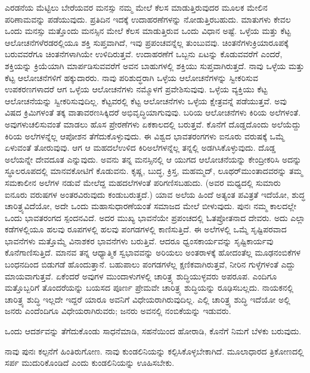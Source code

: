 ಎರಡನೆಯ ಮೆಟ್ಟಿಲು ಬೇರೆಯವರ ಮನಸ್ಸು ನಮ್ಮ ಮೇಲೆ ಕೆಲಸ ಮಾಡುತ್ತಿರುವುದರ ಮೂಲಕ ಮೇಲಿನ ಪರಿಣಾಮವನ್ನು ಪಡೆಯುವುದು. ಪ್ರತಿದಿನ ಇದಕ್ಕೆ ಉದಾಹರಣೆಗಳನ್ನು ನೋಡುತ್ತಿರಬಹುದು. ಮಾತುಗಳು ಕೇವಲ ಒಂದು ಮನಸ್ಸು ಮತ್ತೊಂದು ಮನಸ್ಸಿನ ಮೇಲೆ ಕೆಲಸ ಮಾಡುತ್ತಿರುವ ಒಂದು ವಿಧಾನ ಅಷ್ಟೆ. ಒಳ್ಳೆಯ ಮತ್ತು ಕೆಟ್ಟ ಆಲೋಚನೆ\-ಗಳೆರಡರಲ್ಲಿಯೂ ಶಕ್ತಿ ಸುಪ್ತವಾಗಿದೆ, ಇವು ಪ್ರಪಂಚವನ್ನೆಲ್ಲ ತುಂಬುವವು. ಚಿಂತನೆಗಳು\break ಕ್ರಿಯಾರೂಪಕ್ಕೆ ಬರುವವರೆಗೂ ಚಿಂತನೆಗಳಾಗಿಯೇ ಉಳಿದಿರುತ್ತವೆ. ಉದಾಹರಣೆಗೆ ಒಬ್ಬನು ಏಟನ್ನು ಕೊಡುವವರೆಗೆ ಎಂದರೆ, ಶಕ್ತಿಯನ್ನು ಕ್ರಿಯೆಯಾಗಿ ಮಾರ್ಪಡಿಸುವವರೆಗೆ ಅವನ ಬಾಹುಗಳಲ್ಲಿ ಶಕ್ತಿಯು ಸುಪ್ತವಾಗಿರುತ್ತದೆ. ನಾವು ಒಳ್ಳೆಯ ಮತ್ತು ಕೆಟ್ಟ ಆಲೋಚನೆಗಳಿಗೆ ಹಕ್ಕುದಾರರು. ನಾವು ಪರಿಶುದ್ಧರಾಗಿ ಒಳ್ಳೆಯ ಆಲೋಚನೆಗಳನ್ನು ಸ್ವೀಕರಿಸುವ ಉಪಕರಣಗಳಾದರೆ ಆಗ ಒಳ್ಳೆಯ ಆಲೋಚನೆಗಳು ನಮ್ಮೊಳಗೆ ಪ್ರವೇಶಿಸುವುವು. ಒಳ್ಳೆಯ ವ್ಯಕ್ತಿಯು ಕೆಟ್ಟ ಆಲೋಚನೆಯನ್ನು ಸ್ವೀಕರಿಸುವುದಿಲ್ಲ. ಕೆಟ್ಟವರಲ್ಲಿ ಕೆಟ್ಟ ಆಲೋಚನೆ\break ಗಳು ಒಳ್ಳೆಯ ಕ್ಷೇತ್ರವನ್ನೆ ಪಡೆಯುತ್ತವೆ. ಅವು ವಿಷದ ಕ್ರಿಮಿಗಳಂತೆ ತಕ್ಕ ವಾತಾವರಣ\break ಸಿಕ್ಕಿದರೆ ಅಭಿವೃದ್ಧಿಯಾಗುವುವು. ಬರಿಯ ಆಲೋಚನೆಗಳು ಕಿರಿಯ ಅಲೆಗಳಂತೆ. ಅವುಗಳು\break ಚಲಿಸುವಂತೆ ಮಾಡಲು ಹೊಸ ಪ್ರೇರಣೆಗಳು ಏಕಕಾಲದಲ್ಲಿ ಬರುತ್ತವೆ. ಕೊನೆಗೆ ದೊಡ್ಡದೊಂದು ಅಲೆಯೆದ್ದು ಕಿರಿಯ ಅಲೆಗಳನ್ನೆಲ್ಲ ಆಪೋಶನ ತೆಗೆದುಕೊಳ್ಳುವುದು. ಈ ವಿಶ್ವದ ಭಾವತರಂಗಗಳು ಐನೂರು ವರುಷಕ್ಕೆ ಒಮ್ಮೆ ಏಳುವಂತೆ ತೋರುವುವು. ಆಗ ಆ ಮಹದಲೆ\break ಉಳಿದ ಕಿರಿಅಲೆಗಳನ್ನೆಲ್ಲ ತನ್ನಲ್ಲಿ ಅಡಗಿಸಿಕೊಳ್ಳುವುದು. ದೊಡ್ಡ ಅಲೆಯನ್ನೇ ದೇವದೂತ ಎನ್ನುವುದು. ಅವನು ತನ್ನ ಮನಸ್ಸಿನಲ್ಲಿ ಆ ಯುಗದ ಆಲೋಚನೆಯನ್ನು ಕೇಂದ್ರೀಕರಿಸಿ ಅದನ್ನು ಸ್ಥೂಲರೂಪದಲ್ಲಿ ಮಾನವಕೋಟಿಗೆ ಕೊಡುವನು. ಕೃಷ್ಣ, ಬುದ್ಧ, ಕ್ರಿಸ್ತ, ಮಹಮ್ಮದ್​, ಲೂಥರ್​ ಮುಂತಾದವರನ್ನು ತಮ್ಮ ಸಮಕಾಲೀನ ಅಲೆಗಳ ನಡುವೆ ಮೇಲೆದ್ದ ಮಹದಲೆಗಳಂತೆ ಪರಿಗಣಿಸಬಹುದು. (ಅವರ ಮಧ್ಯದಲ್ಲಿ ಸುಮಾರು ಐನೂರು ವರುಷಗಳ ಅಂತರವಿರುವುದು ಕಂಡುಬರುತ್ತದೆ.) ಯಾವ ಅಲೆಯ ಹಿಂದೆ ಅತ್ಯಂತ ಪವಿತ್ರತೆ ಇದೆಯೋ, ಶುದ್ಧ ಚಾರಿತ್ರ್ಯವಿದೆಯೋ, ಅದೇ ಒಂದು ಮಹಾಸುಧಾರಣೆಯಂತೆ ಸಮಾಜದ ಮೇಲೆ ಬೀಳುವುದು. ಪುನಃ ನಮ್ಮ ಕಾಲದಲ್ಲೇ ಒಂದು ಭಾವತರಂಗದ ಸ್ಪಂದನವಿದೆ. ಅದರ ಮುಖ್ಯ ಭಾವನೆಯೇ ಪ್ರಪಂಚದಲ್ಲಿ ಓತಪ್ರೋತನಾದ ದೇವರು. ಅದು ಎಲ್ಲಾ ಕಡೆಗಳಲ್ಲಿಯೂ ಹಲವು ರೂಪಗಳಲ್ಲಿ ಹಲವು ಪಂಗಡಗಳಲ್ಲಿ ಕಾಣಿಸುತ್ತಿದೆ. ಈ ಅಲೆಗಳಲ್ಲಿ ಒಮ್ಮೆ ಸೃಷ್ಟಿಪರವಾದ ಭಾವನೆಗಳು ಮತ್ತೊಮ್ಮೆ ವಿನಾಶಕರ ಭಾವನೆಗಳು ಬರುತ್ತಿವೆ. ಆದರೂ ಧ್ವಂಸಕಾರ್ಯವನ್ನು ಸೃಷ್ಟಿಕಾರ್ಯವು ಕೊನೆಗಾಣಿಸುತ್ತಿದೆ. ಮಾನವ ತನ್ನ ಆಧ್ಯಾತ್ಮಿಕ ಸ್ವಭಾವವನ್ನು ಅರಿಯಲು ಅಂತರಾಳಕ್ಕೆ ಹೋದಂತೆಲ್ಲ ಮೂಢನಂಬಿಕೆಗಳ ಬಂಧನದಿಂದ ಬಿಡುಗಡೆ ಹೊಂದುತ್ತಾನೆ. ಬಹುಪಾಲು ಪಂಗಡಗಳೆಲ್ಲ ಕ್ಷಣಿಕವಾಗಿರುತ್ತವೆ, ನೀರಿನ ಗುಳ್ಳೆಗಳಂತೆ ಎದ್ದು ಮಾಯವಾಗುತ್ತವೆ. ಏಕೆಂದರೆ ಅವುಗಳ ಮುಂದಾಳುಗಳಲ್ಲಿ ಚಾರಿತ್ರ್ಯ ಶುದ್ಧಿಯುಳ್ಳವರು ಅಪರೂಪ. ಎಂದಿಗೂ ಮತ್ತೊಬ್ಬರಿಗೆ ತೊಂದರೆಯನ್ನು ಬಯಸದ ಪೂರ್ಣ ಪ್ರೇಮವೇ ಚಾರಿತ್ರ್ಯ ಶುದ್ಧಿಯನ್ನು ರೂಢಿಸಬಲ್ಲದು. ನಾಯಕನಲ್ಲಿ ಚಾರಿತ್ರ್ಯ ಶುದ್ಧಿ ಇಲ್ಲದೇ ಇದ್ದರೆ ಯಾರೂ ಅವನಿಗೆ ವಿಧೇಯರಾಗಿರುವುದಿಲ್ಲ. ಎಲ್ಲಿ ಚಾರಿತ್ರ್ಯ ಶುದ್ಧಿ ಇದೆಯೋ ಅಲ್ಲಿ ಜನರು ಎಂದೆಂದಿಗೂ ವಿಧೇಯರಾಗಿರುವರು; ಜನರು ಅವನಲ್ಲಿ ನಂಬಿಕೆಯನ್ನು ಇಡುವರು.

ಒಂದು ಆದರ್ಶವನ್ನು ತೆಗೆದುಕೊಂಡು ಸಾಧನೆಮಾಡಿ, ಸಹನೆಯಿಂದ ಹೋರಾಡಿ, ಕೊನೆಗೆ ನಿಮಗೆ ಬೆಳಕು ಬರುವುದು.

\delimiter

ನಾವು ಪುನಃ ಕಲ್ಪನೆಗೆ ಹಿಂತಿರುಗೋಣ. ನಾವು ಕುಂಡಲಿನಿಯನ್ನು ಕಲ್ಪಿಸಿಕೊಳ್ಳಬೇಕಾಗಿದೆ. ಮೂಲಾಧಾರದ ತ್ರಿಕೋಣದಲ್ಲಿ ಸರ್ಪ ಮುದುರಿಕೊಂಡಿದೆ ಎಂದು ಕುಂಡಲಿನಿಯನ್ನು ಊಹಿಸಬೇಕು.


